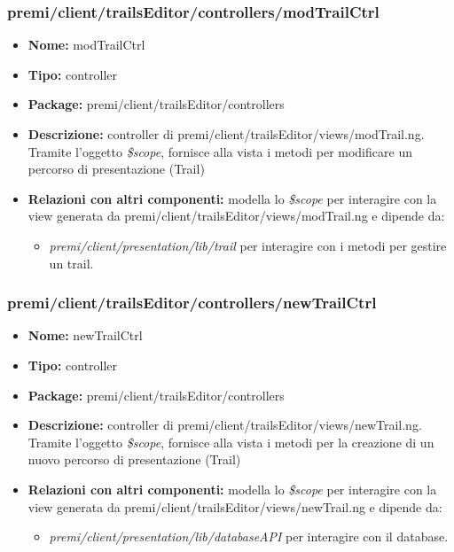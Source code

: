 \subsubsection{premi/client/trailsEditor/controllers/modTrailCtrl}
\begin{itemize}
  \item[] \textbf{Nome:} modTrailCtrl
  \item[] \textbf{Tipo:} controller
  \item[] \textbf{Package:} premi/client/trailsEditor/controllers
  \item[] \textbf{Descrizione:} controller di premi/client/trailsEditor/views/modTrail.ng. Tramite l'oggetto \textit{\$scope}, fornisce alla vista i metodi per modificare un percorso di presentazione (Trail)
  \item[] \textbf{Relazioni con altri componenti:} modella lo \textit{\$scope} per interagire con la view generata da premi/client/trailsEditor/views/modTrail.ng e dipende da:
  \begin{itemize}
  	\item \textit{premi/client/presentation/lib/trail} per interagire con i metodi per gestire un trail.
  \end{itemize}
\end{itemize}
\subsubsection{premi/client/trailsEditor/controllers/newTrailCtrl}
\begin{itemize}
  \item[] \textbf{Nome:} newTrailCtrl
  \item[] \textbf{Tipo:} controller
  \item[] \textbf{Package:} premi/client/trailsEditor/controllers
  \item[] \textbf{Descrizione:} controller di premi/client/trailsEditor/views/newTrail.ng. Tramite l'oggetto \textit{\$scope}, fornisce alla vista i metodi per la creazione di un nuovo percorso di presentazione (Trail)
  \item[] \textbf{Relazioni con altri componenti:} modella lo \textit{\$scope} per interagire con la view generata da premi/client/trailsEditor/views/newTrail.ng e dipende da:
  \begin{itemize}
  	\item \textit{premi/client/presentation/lib/databaseAPI} per interagire con il database.
  \end{itemize}
\end{itemize}
